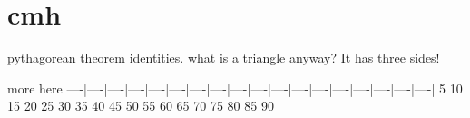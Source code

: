\section{cmh}
pythagorean theorem identities. what is a triangle anyway? It has
three sides!

more here
----|----|----|----|----|----|----|----|----|----|----|----|----|----|----|----|----|----|
   5   10   15   20   25   30   35   40   45   50   55   60   65   70   75   80   85   90